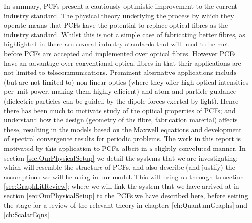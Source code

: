 In summary, PCFs present a cautiously optimistic improvement to the current industry standard.
The physical theory underlying the process by which they operate means that PCFs have the potential to replace optical fibres as the industry standard.
Whilst this is not a simple case of fabricating better fibres, as highlighted in \cite{knight2003photonic} there are several industry standards that will need to be met before PCFs are accepted and implemented over optical fibres.
However PCFs have an advantage over conventional optical fibres in that their applications are not limited to telecommunications.
Prominent alternative applications include (but are not limited to) non-linear optics (where they offer high optical intensities per unit power, making them highly efficient) and atom and particle guidance (dielectric particles can be guided by the dipole forces exerted by light).
Hence there has been much to motivate study of the optical properties of PCFs; and understand how the design (geometry of the fibre, fabrication material) affects these, resulting in the models based on the Maxwell equations and development of spectral convergence results for periodic problems.
The work in this report is motivated by this application to PCFs, albeit in a slightly convoluted manner.
In section \ref{sec:OurPhysicalSetup} we detail the systems that we are investigating; which will resemble the structure of PCFs, and also describe (and justify) the assumptions we will be using in our model.
This will bring us through to section \ref{sec:GraphLitReview}; where we will link the system that we have arrived at in section \ref{sec:OurPhysicalSetup} to the PCFs we have described here, before setting the stage for a review of the relevant theory in chapters \ref{ch:QuantumGraphs} and \ref{ch:ScalarEqns}.

